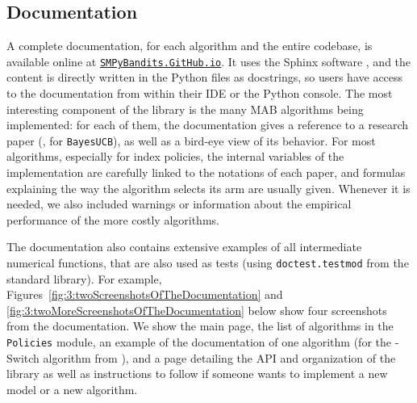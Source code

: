 \subsection{Documentation}

A complete documentation, for each algorithm and the entire codebase, is available online at
\texttt{\href{https://SMPyBandits.GitHub.io}{SMPyBandits.GitHub.io}}.
It uses the Sphinx software \cite{sphinx}, and the content is directly written in the Python files as docstrings, so users have access to the documentation from within their IDE or the Python console.
The most interesting component of the library is the many MAB algorithms being implemented: for each of them, the documentation gives a reference to a research paper (\eg, \cite{Kaufmann12BUCB} for \texttt{BayesUCB}), as well as a bird-eye view of its behavior.
For most algorithms, especially for index policies, the internal variables of the implementation are carefully linked to the notations of each paper, and formulas explaining the way the algorithm selects its arm are usually given.
Whenever it is needed, we also included warnings or information about the empirical performance of the more costly algorithms.

The documentation also contains extensive examples of all intermediate numerical functions, that are also used as tests (using \texttt{doctest.testmod} from the standard library).
For example, Figures~\ref{fig:3:twoScreenshotsOfTheDocumentation} and \ref{fig:3:twoMoreScreenshotsOfTheDocumentation} below show four screenshots from the documentation.
We show the main page, the list of algorithms in the \texttt{Policies} module, an example of the documentation of one algorithm (for the \klUCB-Switch algorithm from \cite{Garivier18}), and a page detailing the API and organization of the library as well as instructions to follow if someone wants to implement a new model or a new algorithm.

